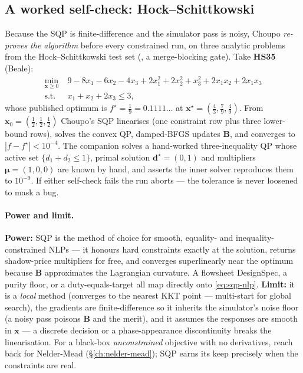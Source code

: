 \documentclass[11pt,a4paper]{article}
\newcommand{\xv}{\mathbf{x}}
\newcommand{\dv}{\mathbf{d}}                          %
\newcommand{\Bv}{\mathbf{B}}                          %
\begin{document}
\subsection{A worked self-check: Hock--Schittkowski}

Because the SQP is finite-difference and the simulator pass is noisy,
Choupo \emph{re-proves the algorithm} before every constrained run, on
three analytic problems from the Hock--Schittkowski test set
\cite{HockSchittkowski} (, a merge-blocking gate). Take
\textbf{HS35} (Beale):
\begin{equation}
\begin{aligned}
   \min_{\xv \ge 0} \; & 9 - 8x_1 - 6x_2 - 4x_3
     + 2x_1^2 + 2x_2^2 + x_3^2 + 2x_1x_2 + 2x_1x_3 \\
   \text{s.t.}\;\; & x_1 + x_2 + 2x_3 \le 3,
\end{aligned}
\end{equation}
whose published optimum is $f^\star = \tfrac19 = 0.1111\ldots$ at
$\xv^\star = (\tfrac43, \tfrac79, \tfrac49)$. From $\xv_0 =
(\tfrac12,\tfrac12,\tfrac12)$ Choupo's SQP linearises (one constraint
row plus three lower-bound rows), solves the convex QP, damped-BFGS
updates $\Bv$, and converges to $|f - f^\star| < 10^{-4}$. The companion
 solves a hand-worked three-inequality QP whose
active set $\{d_1 + d_2 \le 1\}$, primal solution $\dv^\star = (0,1)$ and
multipliers $\boldsymbol\mu = (1, 0, 0)$ are known by hand, and asserts
the inner solver reproduces them to $10^{-9}$. If either self-check
fails the run aborts --- the tolerance is never loosened to mask a bug.

\paragraph{Power and limit.} \textbf{Power:} SQP is the method of choice
for smooth, equality- and inequality-constrained NLPs --- it honours
hard constraints exactly at the solution, returns shadow-price
multipliers for free, and converges superlinearly near the optimum
because $\Bv$ approximates the Lagrangian curvature. A flowsheet
DesignSpec, a purity floor, or a duty-equals-target all map directly
onto \eqref{eq:sqp-nlp}. \textbf{Limit:} it is a \emph{local} method
(converges to the nearest KKT point --- multi-start for global search),
the gradients are finite-difference so it inherits the simulator's noise
floor (a noisy pass poisons $\Bv$ and the merit), and it assumes the
responses are smooth in $\xv$ --- a discrete decision or a
phase-appearance discontinuity breaks the linearisation. For a black-box
\emph{unconstrained} objective with no derivatives, reach back for
Nelder-Mead (§\ref{ch:nelder-mead}); SQP earns its keep precisely when
the constraints are real.
\end{document}
